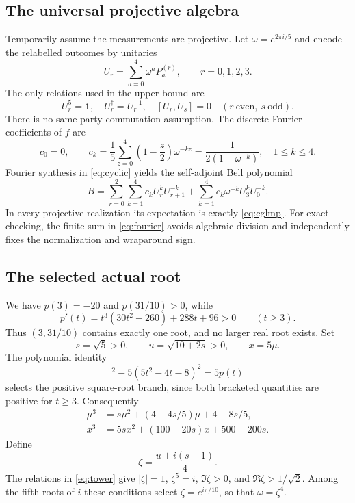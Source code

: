 \documentclass[11pt,a4paper]{article}
\numberwithin{equation}{section}
\theoremstyle{remark}\newtheorem{remark}[theorem]{Remark}
\newcommand{\id}{\mathbf 1}
\newcommand{\adj}{\dagger}
\begin{document}
\subsection{The universal projective algebra}
Temporarily assume the measurements are projective. Let
$\omega=e^{2\pi i/5}$ and encode the relabelled outcomes by unitaries
\begin{equation}
 U_r=\sum_{a=0}^4\omega^aP^{(r)}_a,\qquad r=0,1,2,3.
\end{equation}
The only relations used in the upper bound are
\begin{equation}\label{eq:relations}
 U_r^5=\id,\quad U_r^\adj=U_r^{-1},\quad
 [U_r,U_s]=0\quad(r\ \text{even},\ s\ \text{odd}).
\end{equation}
There is no same-party commutation assumption.
The discrete Fourier coefficients of $f$ are
\begin{equation}\label{eq:fourier}
 c_0=0,\qquad
 c_k=\frac15\sum_{z=0}^4\left(1-\frac z2\right)\omega^{-kz}
     =\frac1{2(1-\omega^{-k})},\quad 1\leq k\leq4.
\end{equation}
Fourier synthesis in \eqref{eq:cyclic} yields the self-adjoint Bell polynomial
\begin{equation}\label{eq:bell}
 B=\sum_{r=0}^2\sum_{k=1}^4c_kU_r^kU_{r+1}^{-k}
   +\sum_{k=1}^4c_k\omega^{-k}U_3^kU_0^{-k}.
\end{equation}
In every projective realization its expectation is exactly \eqref{eq:cglmp}.
For exact checking, the finite sum in \eqref{eq:fourier} avoids algebraic
division and independently fixes the normalization and wraparound sign.

\subsection{The selected actual root}
We have $p(3)=-20$ and $p(31/10)>0$, while
\begin{equation}
 p'(t)=t^3(30t^2-260)+288t+96>0\qquad(t\geq3).
\end{equation}
Thus $(3,31/10)$ contains exactly one root, and no larger real root exists.
Set
\begin{equation}\label{eq:tower}
 s=\sqrt5>0,\qquad u=\sqrt{10+2s}>0,\qquad x=5\mu.
\end{equation}
The polynomial identity
\begin{equation}
 [5(t^3-4t-4)]^2-5(5t^2-4t-8)^2=5p(t)
\end{equation}
selects the positive square-root branch, since both bracketed quantities are
positive for $t\geq3$. Consequently
\begin{align}
 \mu^3&=s\mu^2+(4-4s/5)\mu+4-8s/5,\label{eq:cubicmu}\\
 x^3&=5sx^2+(100-20s)x+500-200s.\label{eq:cubic}
\end{align}
Define
\begin{equation}\label{eq:zeta}
 \zeta=\frac{u+i(s-1)}4.
\end{equation}
The relations in \eqref{eq:tower} give $|\zeta|=1$, $\zeta^5=i$,
$\Im\zeta>0$, and $\Re\zeta>1/\sqrt2$. Among the fifth roots of $i$ these
conditions select $\zeta=e^{i\pi/10}$, so that $\omega=\zeta^4$.
\end{document}
